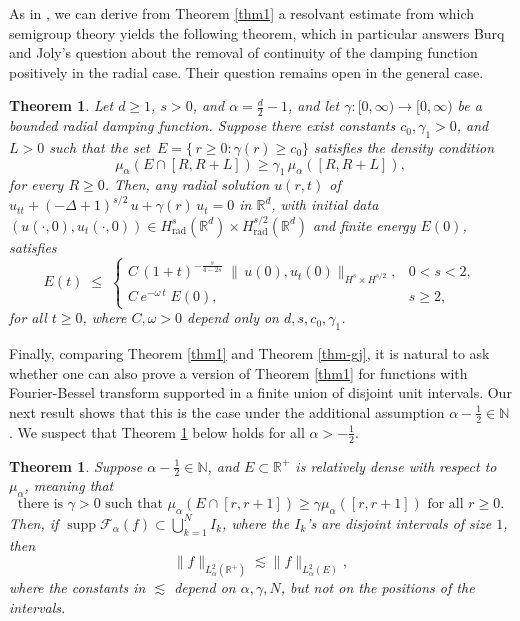 \documentclass[11pt,a4paper,reqno,dvipsnames]{amsart}
\newcommand{\supp}{\operatorname{supp}}
\newcommand{\N}{\mathbb N}
\newcommand{\F}{\mathcal{F}}
\newcommand{\R}{\mathbb R}
\renewcommand{\ge}{\geqslant}
\renewcommand{\le}{\leqslant}
\numberwithin{equation}{section}
\theoremstyle{plain}
\newtheorem{theorem}[equation]{Theorem}
\theoremstyle{definition}
\theoremstyle{remark}
\begin{document}
As in \cite{malhi2020energy, green2019decay, green-jaye-mitkovski}, we can derive from Theorem \ref{thm1} a resolvant estimate from which semigroup theory \cite{gearhart78, pruss84, borichev10} yields the following theorem, which in particular answers Burq and Joly's question about the removal of continuity of the damping function positively in the radial case. Their question remains open in the general case. 

\begin{theorem}
    \label{thm-damped}
     Let \(d\ge1\), \(s>0\), and \(\alpha=\tfrac d2-1\), and let \(\gamma:[0,\infty)\to[0,\infty)\) be a bounded radial damping function.  Suppose there exist constants \(c_{0}, \gamma_1 >0\), and \(L>0\) such that the set \(\,E=\{\,r\ge0:\gamma(r)\ge c_{0}\}\) 
satisfies the density condition
\begin{equation}
\label{rdensity}
    \mu_{\alpha}(E\cap[R,R+L])\ge\gamma_{1}\,\mu_{\alpha}([R,R+L]),
\end{equation}
for every \(R\ge0\). Then, any radial solution \(u(r,t)\) of 
\(u_{tt}+(-\Delta+1)^{s/2}\, u+\gamma(r)\,u_t=0\) 
in \(\R^{d}\), with initial data 
\((u(\cdot,0),u_t(\cdot,0))\in H^{s}_{\mathrm{rad}}(\R^{d})\times H^{s/2}_{\mathrm{rad}}(\R^{d})\) 
and finite energy \(E(0)\), satisfies
\[
E(t)\;\le\;
\begin{cases}
C\,(1+t)^{-\frac{s}{4-2s}}\;\bigl\|\,u(0),u_t(0)\bigr\|_{H^{s}\times H^{s/2}},
&0<s<2,\\[0.5em]
C\,e^{-\omega\,t}\;E(0),
&s\ge2,
\end{cases}
\]
for all \(t\ge0\), where \(C,\omega>0\) depend only on \(d,s,c_{0},\gamma_{1}\).
\end{theorem}

Finally, comparing Theorem \ref{thm1} and Theorem \ref{thm-gj}, it is natural to ask whether one can  also prove a version of Theorem \ref{thm1} for functions with Fourier-Bessel transform supported in a finite union of disjoint unit intervals.  Our next result shows that this is the case under the additional assumption $\alpha - \frac{1}{2} \in \N$.  We suspect that Theorem \ref{thm2} below holds for all $\alpha > -\frac{1}{2}$.

\begin{tcolorbox}[colback=SeaGreen!10, colframe=SeaGreen!80, boxrule=0.5mm, left=2mm, right=2mm, boxsep=1mm, arc=1mm.]
\begin{theorem}
\label{thm2}
Suppose $\alpha - \frac{1}{2} \in \N$, and $E\subset\R^+$ is relatively dense with respect to $\mu_{\alpha}$, meaning that
$$\text{there is }\gamma>0 \text{ such that }\mu_\alpha(E\cap [r,r+1]) \ge \gamma \mu_\alpha([r,r+1]) \text{ for all }r\ge 0.$$ 
Then, if $\supp \F_\alpha(f) \subset \bigcup_{k=1}^N I_k$, where the $I_k$'s are disjoint intervals of size $1$, then 
$$\|f\|_{L^2_\alpha(\R^+)} \lesssim \|f\|_{L^2_\alpha(E)},$$
where the constants in $\lesssim$ depend on $\alpha, \gamma, N$, but not on the positions of the intervals.
\end{theorem}
\end{tcolorbox}
\end{document}
